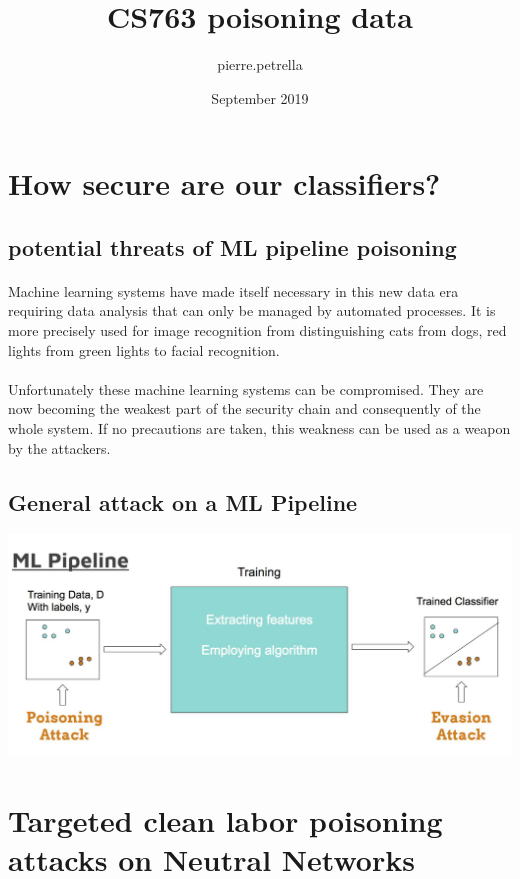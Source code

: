 \documentclass{article}
\title{CS763 poisoning data}
\author{pierre.petrella }
\date{September 2019}
\begin{document}
\maketitle
\tableofcontents
\newpage
\section*{How secure are our classifiers? }
\subsection {potential threats of ML pipeline poisoning}
\paragraph{}
Machine learning systems have made itself necessary in this new data era requiring data analysis that can only be managed by automated processes. It is more precisely used for image recognition from distinguishing cats from dogs, red lights from green lights to facial recognition. 
\paragraph{}
Unfortunately these machine learning systems can be compromised. They are now becoming the weakest part of the security chain and consequently of the whole system. If no precautions are taken, this weakness can be used as a weapon by the attackers.

\subsection{General attack on a ML Pipeline}
\includegraphics[scale=0.3]{MLpipeline.png}
\section{Targeted clean labor poisoning attacks on Neutral Networks}
\end{document}

